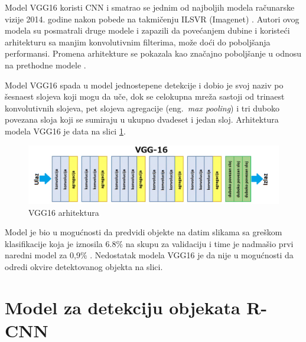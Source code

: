 \documentclass[12pt,oneside]{memoir}
\begin{document}
Model VGG16 koristi CNN i smatrao se jednim od najboljih modela računarske vizije 2014. godine nakon pobede na takmičenju ILSVR (Imagenet) \cite{simonyan2014very}. Autori ovog modela su posmatrali druge modele i zapazili da povećanjem dubine i koristeći arhitekturu sa manjim konvolutivnim filterima, može doći do poboljšanja performansi. Promena arhitekture se pokazala kao značajno poboljšanje u odnosu na prethodne modele \cite{simonyan2014very}. 

Model VGG16 spada u model jednostepene detekcije i dobio je svoj naziv po šesnaest slojeva koji mogu da uče, dok se celokupna mreža sastoji od trinaest konvolutivnih slojeva, pet slojeva agregacije (eng.~\textit{max pooling}) i tri duboko povezana sloja koji se sumiraju u ukupno dvadeset i jedan sloj. Arhitektura modela VGG16 je data na slici \ref{fig:section2_vgg16}.

\begin{figure}[ht]
    \centering
    \includegraphics[width=1\textwidth]{matfmaster/glava2/vgg16_2.png}
    \caption{VGG16 arhitektura}
    \label{fig:section2_vgg16}
\end{figure}

Model je bio u mogućnosti da predvidi objekte na datim slikama sa greškom klasifikacije koja je iznosila 6.8\% na skupu za validaciju i time je nadmašio prvi naredni model za 0,9\% \cite{simonyan2014very}.
Nedostatak modela VGG16 je da nije u mogućnosti da odredi okvire detektovanog objekta na slici.



\section{Model za detekciju objekata R-CNN}
\end{document}
